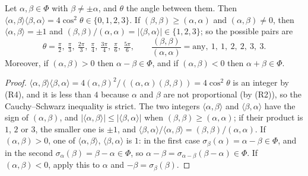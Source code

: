 \begin{lemma}\label{representation-theory:lemma-pairs-of-roots}
Let $\alpha, \beta \in \Phi$ with $\beta \neq \pm\alpha$, and $\theta$ the angle between them. Then $\langle\alpha, \beta\rangle\langle\beta, \alpha\rangle = 4\cos^2\theta \in \{0, 1, 2, 3\}$.
If $(\beta, \beta) \geq (\alpha, \alpha)$ and $(\alpha, \beta) \neq 0$, then $\langle\alpha, \beta\rangle = \pm1$ and $(\beta, \beta)/(\alpha, \alpha) = |\langle\beta, \alpha\rangle| \in
\{1, 2, 3\}$; so the possible pairs are
\[
\theta = \tfrac{\pi}{2},\ \tfrac{\pi}{3},\ \tfrac{2\pi}{3},\ \tfrac{\pi}{4},\ \tfrac{3\pi}{4},\ \tfrac{\pi}{6},\ \tfrac{5\pi}{6}, \qquad \frac{(\beta, \beta)}{(\alpha, \alpha)} = \text{any},\ 1,\ 1,\ 2,\ 2,\ 3,\ 3 .
\]
Moreover, if $(\alpha, \beta) > 0$ then $\alpha - \beta \in \Phi$, and if $(\alpha, \beta) < 0$ then $\alpha + \beta \in \Phi$.
\end{lemma}

\begin{proof}
$\langle\alpha, \beta\rangle\langle\beta, \alpha\rangle = 4(\alpha, \beta)^2/((\alpha, \alpha)(\beta, \beta)) = 4\cos^2\theta$ is an integer by (R4), and it is less than $4$ because
$\alpha$ and $\beta$ are not proportional (by (R2)), so the Cauchy--Schwarz inequality is strict. The two integers $\langle\alpha, \beta\rangle$ and $\langle\beta, \alpha\rangle$ have
the sign of $(\alpha, \beta)$, and $|\langle\alpha, \beta\rangle| \leq |\langle\beta, \alpha\rangle|$ when $(\beta, \beta) \geq (\alpha, \alpha)$; if their product is $1$, $2$ or $3$,
the smaller one is $\pm1$, and $\langle\beta, \alpha\rangle/\langle\alpha, \beta\rangle = (\beta, \beta)/(\alpha, \alpha)$. If $(\alpha, \beta) > 0$, one of $\langle\alpha, \beta\rangle$,
$\langle\beta, \alpha\rangle$ is $1$: in the first case $\sigma_\beta(\alpha) = \alpha - \beta \in \Phi$, and in the second $\sigma_\alpha(\beta) = \beta - \alpha \in \Phi$, so
$\alpha - \beta = \sigma_{\alpha - \beta}(\beta - \alpha) \in \Phi$. If $(\alpha, \beta) < 0$, apply this to $\alpha$ and $-\beta = \sigma_\beta(\beta)$.
\end{proof}

